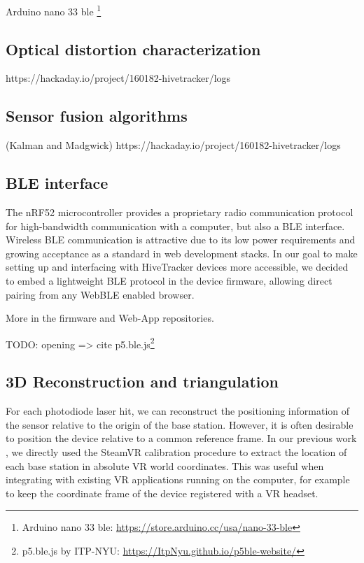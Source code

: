 \documentclass[sigchi]{acmart}
\begin{document}
Arduino nano 33 ble \footnote{Arduino nano 33 ble: \url{https://store.arduino.cc/usa/nano-33-ble}} 

\subsection{Optical distortion characterization}
https://hackaday.io/project/160182-hivetracker/logs

\subsection{Sensor fusion algorithms}
 (Kalman and Madgwick)
https://hackaday.io/project/160182-hivetracker/logs


\subsection{BLE interface}

The nRF52 microcontroller provides a proprietary radio communication protocol for high-bandwidth communication with a computer, but also a BLE interface. Wireless BLE communication is attractive due to its low power requirements and growing acceptance as a standard in web development stacks. In our goal to make setting up and interfacing with HiveTracker devices more accessible, we decided to embed a lightweight BLE protocol in the device firmware, allowing direct pairing from any WebBLE enabled browser.

More in the firmware \cite{firmwareRepo} and Web-App \cite{WebappRepo} repositories.

TODO: opening => cite p5.ble.js\footnote{p5.ble.js by ITP-NYU: \url{https://ItpNyu.github.io/p5ble-website/}}

\subsection{3D Reconstruction and triangulation}

For each photodiode laser hit, we can reconstruct the positioning information of the sensor relative to the origin of the base station. However, it is often desirable to position the device relative to a common reference frame. In our previous work \cite{Quinones2018}, we directly used the SteamVR calibration procedure to extract the location of each base station in absolute VR world coordinates. This was useful when integrating with existing VR applications running on the computer, for example to keep the coordinate frame of the device registered with a VR headset.
\end{document}
